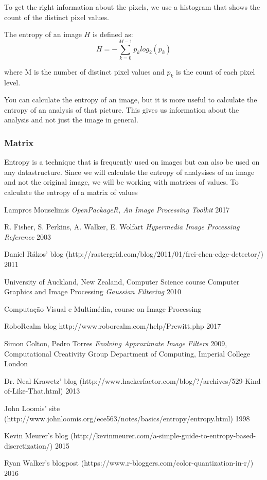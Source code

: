 \documentclass[12pt]{article}
\begin{document}
To get the right information about the pixels, we use a histogram that shows the count of the distinct pixel values. 
\newline

The entropy of an image $H$ is defined as:
\begin{equation}
H = - \sum_{k=0}^{M-1} p_k log_2 (p_k)
\end{equation}

where M is the number of distinct pixel values and $p_k$ is the count of each pixel level.
\newline

You can calculate the entropy of an image, but it is more useful to calculate the entropy of an analysis of that picture. This gives us information about the analysis and not just the image in general.

\subsubsection{Matrix}

Entropy is a technique that is frequently used on images but can also be used on any datastructure. Since we will calculate the entropy of analysises of an image and not the original image, we will be working with matrices of values. To calculate the entropy of a matrix of values 

\begin{thebibliography}{1}

 Lampros Mouselimis {\em OpenPackageR, An Image Processing Toolkit} 2017

 R. Fisher, S. Perkins, A. Walker, E. Wolfart {\em Hypermedia Image Processing Reference} 2003

 Daniel R\'akos' blog (http://rastergrid.com/blog/2011/01/frei-chen-edge-detector/) 2011

 University of Auckland, New Zealand, Computer Science course Computer Graphics and Image Processing {\em Gaussian Filtering} 2010

 Computaç\~ao Visual e Multimédia, course on Image Processing

 RoboRealm blog {http://www.roborealm.com/help/Prewitt.php} 2017

 Simon Colton, Pedro Torres {\em Evolving Approximate Image Filters} 2009, Computational Creativity Group
Department of Computing, Imperial College London

 Dr. Neal Krawetz' blog (http://www.hackerfactor.com/blog/?/archives/529-Kind-of-Like-That.html) 2013

 John Loomis' site (http://www.johnloomis.org/ece563/notes/basics/entropy/entropy.html) 1998

 Kevin Meurer's blog (http://kevinmeurer.com/a-simple-guide-to-entropy-based-discretization/) 2015

 Ryan Walker's blogpost (https://www.r-bloggers.com/color-quantization-in-r/) 2016

\end{thebibliography}
\end{document}
